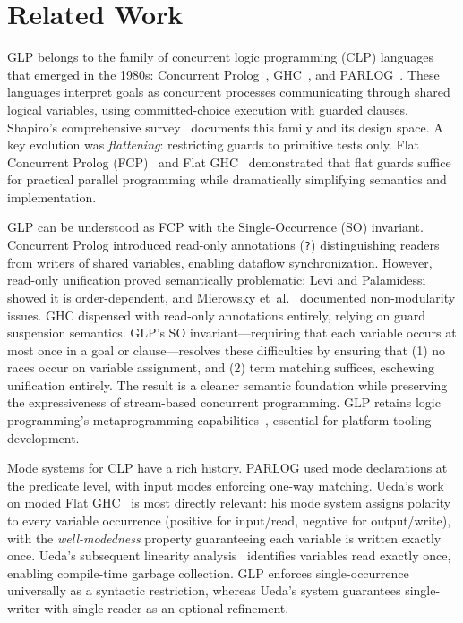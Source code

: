 \section{Related Work}\label{section:related-work}

GLP belongs to the family of concurrent logic programming (CLP) languages that emerged in the 1980s: Concurrent Prolog~\cite{shapiro1983subset}, GHC~\cite{ueda1986guarded}, and PARLOG~\cite{clark1986parlog}. These languages interpret goals as concurrent processes communicating through shared logical variables, using committed-choice execution with guarded clauses. Shapiro's comprehensive survey~\cite{shapiro1989family} documents this family and its design space.
%
A key evolution was \emph{flattening}: restricting guards to primitive tests only. Flat Concurrent Prolog (FCP)~\cite{mierowsky1985fcp} and Flat GHC~\cite{ueda1986guarded} demonstrated that flat guards suffice for practical parallel programming while dramatically simplifying semantics and implementation.

GLP can be understood as FCP with the Single-Occurrence (SO) invariant. Concurrent Prolog introduced read-only annotations (\verb|?|) distinguishing readers from writers of shared variables, enabling dataflow synchronization. However, read-only unification proved semantically problematic: Levi and Palamidessi~\cite{levi1985readonly} showed it is order-dependent, and Mierowsky et~al.~\cite{mierowsky1985fcp} documented non-modularity issues. GHC dispensed with read-only annotations entirely, relying on guard suspension semantics.
%
GLP's SO invariant---requiring that each variable occurs at most once in a goal or clause---resolves these difficulties by ensuring that (1) no races occur on variable assignment, and (2) term matching suffices, eschewing unification entirely. The result is a cleaner semantic foundation while preserving the expressiveness of stream-based concurrent programming. GLP retains logic programming's metaprogramming capabilities~\cite{safra1988meta,lichtenstein1988concurrent,shapiro1984systems}, essential for platform tooling development.

Mode systems for CLP have a rich history. PARLOG used mode declarations at the predicate level, with input modes enforcing one-way matching. Ueda's work on moded Flat GHC~\cite{ueda1994moded,ueda1995io} is most directly relevant: his mode system assigns polarity to every variable occurrence (positive for input/read, negative for output/write), with the \emph{well-modedness} property guaranteeing each variable is written exactly once. Ueda's subsequent linearity analysis~\cite{ueda2001resource} identifies variables read exactly once, enabling compile-time garbage collection. GLP enforces single-occurrence universally as a syntactic restriction, whereas Ueda's system guarantees single-writer with single-reader as an optional refinement.

